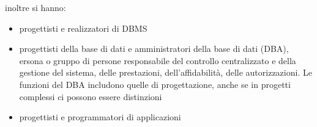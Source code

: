 \documentclass[a4paper,12pt, oneside]{book}
\begin{document}
inoltre si hanno:
\begin{itemize}
\item progettisti e realizzatori di DBMS
\item progettisti della base di dati e
amministratori della base di dati (DBA), ersona o gruppo di persone
responsabile del controllo centralizzato
e della gestione del sistema, delle
prestazioni, dell'affidabilità, delle
autorizzazioni. Le funzioni del DBA includono quelle di
progettazione, anche se in progetti
complessi ci possono essere distinzioni
\item progettisti e programmatori di applicazioni
\end{itemize}
\end{document}
